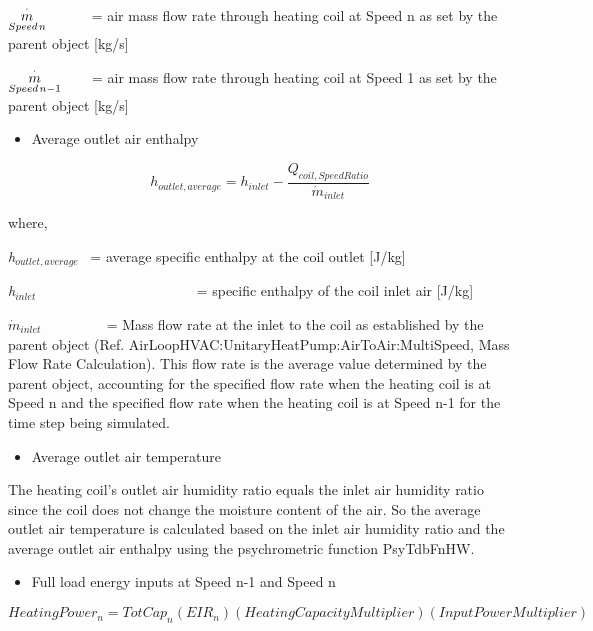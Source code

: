 \({\mathop {{\rm{ }}m}\limits_{Speed{\kern 1pt} n}^ \cdot }\) ~~~~~ = air mass flow rate through heating coil at Speed n as set by the parent object {[}kg/s{]}

\({\mathop {{\rm{ }}m}\limits_{Speed{\kern 1pt} n - 1}^ \cdot }\) ~~~ = air mass flow rate through heating coil at Speed 1 as set by the parent object {[}kg/s{]}

\begin{itemize}
  \item Average outlet air enthalpy
\end{itemize}

\begin{equation}
  h_{outlet,average} = h_{inlet} - \frac{Q_{coil,SpeedRatio}}{\dot{m}_{inlet}}
\end{equation}

where,

\emph{h\(_{outlet,average}\)}~ = average specific enthalpy at the coil outlet {[}J/kg{]}

\emph{h\(_{inlet}\)~~~~~~~~~~~}~~~~~~~~~~~ = specific enthalpy of the coil inlet air {[}J/kg{]}

\({\dot m_{inlet}}\) ~~~~~~~~ = Mass flow rate at the inlet to the coil as established by the parent object (Ref. AirLoopHVAC:UnitaryHeatPump:AirToAir:MultiSpeed, Mass Flow Rate Calculation). This flow rate is the average value determined by the parent object, accounting for the specified flow rate when the heating coil is at Speed n and the specified flow rate when the heating coil is at Speed n-1 for the time step being simulated.

\begin{itemize}
  \item Average outlet air temperature
\end{itemize}

The heating coil's outlet air humidity ratio equals the inlet air humidity ratio since the coil does not change the moisture content of the air. So the average outlet air temperature is calculated based on the inlet air humidity ratio and the average outlet air enthalpy using the psychrometric function PsyTdbFnHW.

\begin{itemize}
  \item Full load energy inputs at Speed n-1 and Speed n
\end{itemize}

\begin{equation}
HeatingPowe{r_n} = TotCa{p_n}\left( {EI{R_n}} \right)\left( {HeatingCapacityMultiplier} \right)\left( {InputPowerMultiplier} \right)
\end{equation}

